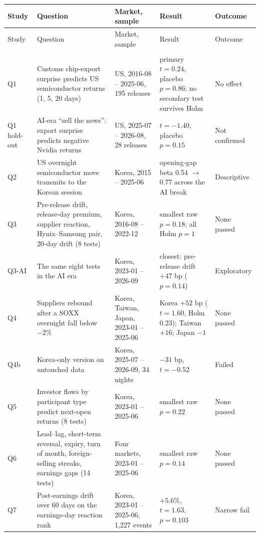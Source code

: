 \documentclass[12pt,a4paper]{article}
\begin{document}
\begingroup
\footnotesize
\setlength{\tabcolsep}{3.5pt}
\begin{longtable}{@{}L{1.3cm} L{4.4cm} L{2.6cm} L{4.6cm} L{2.0cm}@{}}
\toprule
Study & Question & Market, sample & Result & Outcome \\
\midrule
\endfirsthead
\toprule
Study & Question & Market, sample & Result & Outcome \\
\midrule
\endhead
\bottomrule
\endfoot
{} \\
Q1 & Customs chip-export surprise predicts US semiconductor returns (1, 5, 20 days) & US, 2016-08 -- 2025-06, 195 releases & primary $t=0.24$, placebo $p=0.86$; no secondary test survives Holm & No effect \\
Q1 hold-out & AI-era ``sell the news'': export surprise predicts negative Nvidia returns & US, 2025-07 -- 2026-08, 28 releases & $t=-1.40$, placebo $p=0.15$ & Not confirmed \\
Q2 & US overnight semiconductor move transmits to the Korean session & Korea, 2015 -- 2025-06 & opening-gap beta 0.54 $\to$ 0.77 across the AI break & Descriptive \\
Q3 & Pre-release drift, release-day premium, supplier reaction, Hynix--Samsung pair, 20-day drift (8 tests) & Korea, 2016-08 -- 2022-12 & smallest raw $p=0.18$; all Holm $p=1$ & None passed \\
Q3-AI & The same eight tests in the AI era & Korea, 2023-01 -- 2026-09 & closest: pre-release drift $+47$ bp ($p=0.14$) & Exploratory \\
Q4 & Suppliers rebound after a SOXX overnight fall below $-2\%$ & Korea, Taiwan, Japan, 2023-01 -- 2025-06 & Korea $+52$ bp ($t=1.60$, Holm 0.23); Taiwan $+16$; Japan $-1$ & None passed \\
Q4b & Korea-only version on untouched data & Korea, 2025-07 -- 2026-09, 34 nights & $-31$ bp, $t=-0.52$ & Failed \\
Q5 & Investor flows by participant type predict next-open returns (8 tests) & Korea, 2023-01 -- 2025-06 & smallest raw $p=0.22$ & None passed \\
Q6 & Lead--lag, short-term reversal, expiry, turn of month, foreign-selling streaks, earnings gaps (14 tests) & Four markets, 2023-01 -- 2025-06 & smallest raw $p=0.14$ & None passed \\
Q7 & Post-earnings drift over 60 days on the earnings-day reaction rank & Korea, 2023-01 -- 2025-06, 1{,}227 events & $+5.6\%$, $t=1.63$, $p=0.103$ & Narrow fail \\

\end{longtable}
\end{document}
